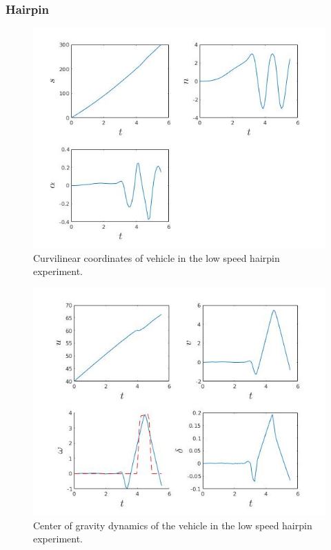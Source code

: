 \documentclass[conference,11pt]{IEEEtran}
\begin{document}
\subsubsection{Hairpin}
\begin{figure}[t]
  \centering
  \includegraphics[scale=0.5]{hairpin_lift_curv.jpg}
  \caption{Curvilinear coordinates of vehicle in the low speed hairpin experiment.}
  \label{fig:cg}
\end{figure}
\begin{figure}[t]
  \centering
  \includegraphics[scale=0.5]{hairpin_lift_cg.jpg}
  \caption{Center of gravity dynamics of the vehicle in the low speed hairpin experiment.}
  \label{fig:cg}
\end{figure}
\end{document}

